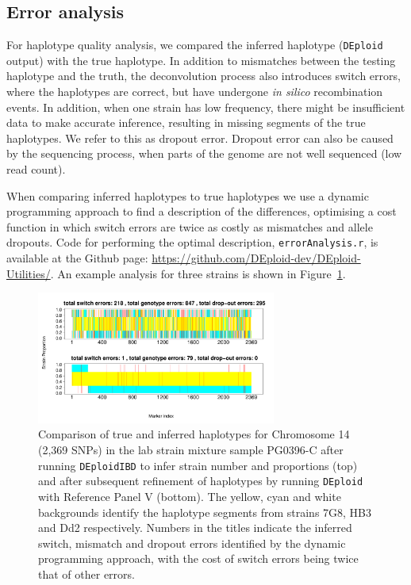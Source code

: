 \documentclass[9pt]{article}
\begin{document}
\subsection{Error analysis}

For haplotype quality analysis, we compared the inferred haplotype ({\tt DEploid} output) with the true haplotype. In addition to mismatches between the testing haplotype and the truth, the deconvolution process also introduces switch errors, where the haplotypes are correct, but have undergone {\it in silico} recombination events. In addition, when one strain has low frequency, there might be insufficient data to make accurate inference, resulting in missing segments of the true haplotypes. We refer to this as dropout error. Dropout error can also be caused by the sequencing process, when parts of the genome are not well sequenced (low read count).

When comparing inferred haplotypes to true haplotypes we use a dynamic programming approach to find a description of the differences, optimising a cost function in which switch errors are twice as costly as mismatches and allele dropouts.  Code for performing the optimal description, {\tt errorAnalysis.r}, is available at the Github page:  \url{https://github.com/DEploid-dev/DEploid-Utilities/}.  An example analysis for three strains is shown in Figure~\ref{fig:error}.



\begin{figure}[htp]
  \centering
    \includegraphics[width=0.7\textwidth]{DEploid_IBD_haps_compare.pdf}
  \caption{Comparison of true and inferred haplotypes for Chromosome 14 (2,369 SNPs) in the lab strain mixture sample PG0396-C after running \texttt{DEploidIBD} to infer strain number and proportions (top) and after subsequent refinement of haplotypes by running \texttt{DEploid} with Reference Panel V (bottom).  The yellow, cyan and white backgrounds identify the haplotype segments from strains 7G8, HB3 and Dd2 respectively. Numbers in the titles indicate the inferred switch, mismatch and dropout errors identified by the dynamic programming approach, with the cost of switch errors being twice that of other errors.
  }
  \label{fig:error}
\end{figure}
\end{document}
